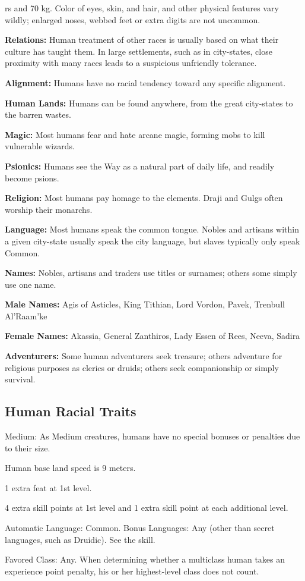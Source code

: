 rs and 70 kg. Color of eyes, skin, and hair, and other physical features vary wildly; enlarged noses, webbed feet or extra digits are not uncommon.

\textbf{Relations:} Human treatment of other races is usually based on what their culture has taught them. In large settlements, such as in city-states, close proximity with many races leads to a suspicious unfriendly tolerance.

\textbf{Alignment:} Humans have no racial tendency toward any specific alignment.

\textbf{Human Lands:} Humans can be found anywhere, from the great city-states to the barren wastes.

\textbf{Magic:} Most humans fear and hate arcane magic, forming mobs to kill vulnerable wizards.

\textbf{Psionics:} Humans see the Way as a natural part of daily life, and readily become psions.

\textbf{Religion:} Most humans pay homage to the elements. Draji and Gulgs often worship their monarchs.

\textbf{Language:} Most humans speak the common tongue. Nobles and artisans within a given city-state usually speak the city language, but slaves typically only speak Common.

\textbf{Names:} Nobles, artisans and traders use titles or surnames; others some simply use one name.

\textbf{Male Names:} Agis of Asticles, King Tithian, Lord Vordon, Pavek, Trenbull Al'Raam'ke

\textbf{Female Names:} Akassia, General Zanthiros, Lady Essen of Rees, Neeva, Sadira

\textbf{Adventurers:} Some human adventurers seek treasure; others adventure for religious purposes as clerics or druids; others seek companionship or simply survival.

\subsection{Human Racial Traits}
\begin{itemize*}
  \item Medium: As Medium creatures, humans have no special bonuses or penalties due to their size. 
  \item Human base land speed is 9 meters.
  \item 1 extra feat at 1st level.
  \item 4 extra skill points at 1st level and 1 extra skill point at each additional level.
  \item Automatic Language: Common. Bonus Languages: Any (other than secret languages, such as Druidic). See the  skill.
  \item Favored Class: Any. When determining whether a multiclass human takes an experience point penalty, his or her highest-level class does not count.
\end{itemize*}
